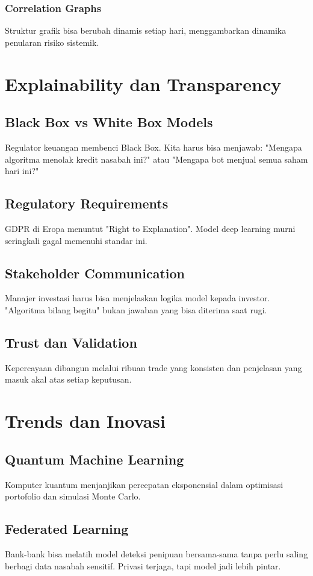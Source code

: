 \documentclass[12pt,a4paper]{book}
\begin{document}
\subsection{Correlation Graphs}
Struktur grafik bisa berubah dinamis setiap hari, menggambarkan dinamika penularan risiko sistemik.

\chapter{Explainability dan Transparency}
\section{Black Box vs White Box Models}
Regulator keuangan membenci Black Box. Kita harus bisa menjawab: "Mengapa algoritma menolak kredit nasabah ini?" atau "Mengapa bot menjual semua saham hari ini?"

\section{Regulatory Requirements}
GDPR di Eropa menuntut "Right to Explanation". Model deep learning murni seringkali gagal memenuhi standar ini.

\section{Stakeholder Communication}
Manajer investasi harus bisa menjelaskan logika model kepada investor. "Algoritma bilang begitu" bukan jawaban yang bisa diterima saat rugi.

\section{Trust dan Validation}
Kepercayaan dibangun melalui ribuan trade yang konsisten dan penjelasan yang masuk akal atas setiap keputusan.

\chapter{Trends dan Inovasi}
\section{Quantum Machine Learning}
Komputer kuantum menjanjikan percepatan eksponensial dalam optimisasi portofolio dan simulasi Monte Carlo.

\section{Federated Learning}
Bank-bank bisa melatih model deteksi penipuan bersama-sama tanpa perlu saling berbagi data nasabah sensitif. Privasi terjaga, tapi model jadi lebih pintar.
\end{document}
